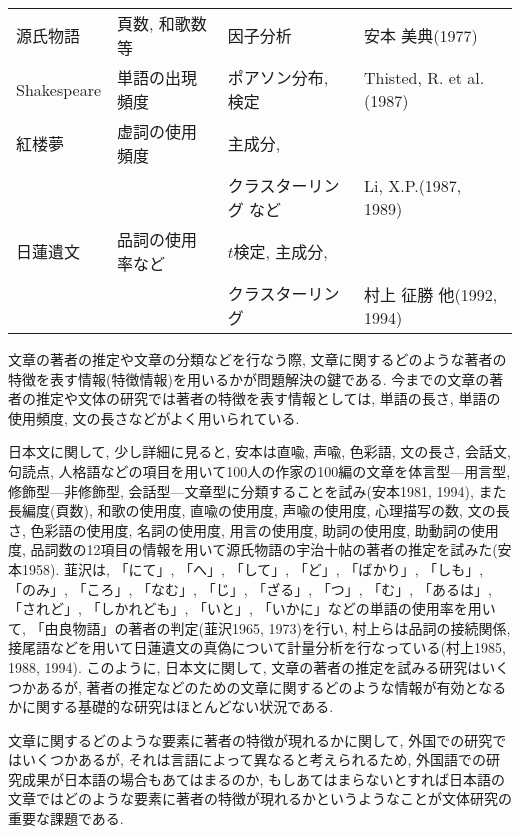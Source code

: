 \begin{table}[htb]
\begin{center}
{\begin{tabular}{llll}
源氏物語                &頁数, 和歌数等  &因子分析              &安本 美典(1977)     \\ 
Shakespeare             &単語の出現頻度  &ポアソン分布, 検定    &Thisted, R. et al. (1987) \\
紅楼夢                  &虚詞の使用頻度  &主成分,               &  \\
                        &                &クラスターリング など &Li, X.P.(1987, 1989) \\ 
日蓮遺文                &品詞の使用率など&$t$検定, 主成分,      &                     \\
                        &                & クラスターリング           &村上 征勝 他(1992, 1994) \\ 
\hline
\end{tabular}
}
\end{center}
\end{table}

文章の著者の推定や文章の分類などを行なう際, 文章に関するどのような著者の特徴を表す情報(特徴情報)を用いるかが問題解決の鍵である.
今までの文章の著者の推定や文体の研究では著者の特徴を表す情報としては, 単語の長さ, 単語の使用頻度, 文の長さなどがよく用いられている. 

日本文に関して, 少し詳細に見ると, 安本は直喩, 声喩, 色彩語, 文の長さ, 会話文, 句読点, 人格語などの項目を用いて100人の作家の100編の文章を体言型—用言型, 修飾型—非修飾型, 会話型—文章型に分類することを試み(安本1981, 1994), 
また長編度(頁数), 和歌の使用度, 直喩の使用度, 声喩の使用度, 心理描写の数, 文の長さ, 色彩語の使用度, 名詞の使用度, 用言の使用度, 助詞の使用度, 助動詞の使用度, 品詞数の12項目の情報を用いて源氏物語の宇治十帖の著者の推定を試みた(安本1958). 韮沢は, 「にて」, 「へ」, 「して」, 「ど」, 「ばかり」, 「しも」, 「のみ」, 「ころ」, 「なむ」, 「じ」, 「ざる」, 「つ」, 「む」, 「あるは」, 「されど」, 「しかれども」, 「いと」, 「いかに」などの単語の使用率を用いて, 「由良物語」の著者の判定(韮沢1965, 1973)を行い, 
村上らは品詞の接続関係, 接尾語などを用いて日蓮遺文の真偽について計量分析を行なっている(村上1985, 1988, 1994). 
このように, 日本文に関して, 文章の著者の推定を試みる研究はいくつかあるが, 著者の推定などのための文章に関するどのような情報が有効となるかに関する基礎的な研究はほとんどない状況である. 

文章に関するどのような要素に著者の特徴が現れるかに関して, 外国での研究ではいくつかあるが, それは言語によって異なると考えられるため, 外国語での研究成果が日本語の場合もあてはまるのか, もしあてはまらないとすれば日本語の文章ではどのような要素に著者の特徴が現れるかというようなことが文体研究の重要な課題である.

